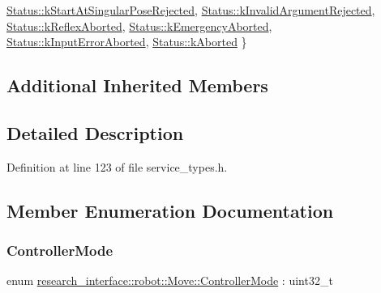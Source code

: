 \begin{DoxyCompactItemize}
\newline
\hyperlink{structresearch__interface_1_1robot_1_1Move_a74e15d249324a1b2d28f0a7cf50dc794ab6f94a8373495e5b2c77367f22b7f560}{Status\+::k\+Start\+At\+Singular\+Pose\+Rejected}, 
\hyperlink{structresearch__interface_1_1robot_1_1Move_a74e15d249324a1b2d28f0a7cf50dc794a9328e3d4adcd129e286cd0e65a9d4a1c}{Status\+::k\+Invalid\+Argument\+Rejected}, 
\hyperlink{structresearch__interface_1_1robot_1_1Move_a74e15d249324a1b2d28f0a7cf50dc794aedb741f9f460686f7d799eb503d047f1}{Status\+::k\+Reflex\+Aborted}, 
\hyperlink{structresearch__interface_1_1robot_1_1Move_a74e15d249324a1b2d28f0a7cf50dc794a452811dc518f62ba40861befb68a20cf}{Status\+::k\+Emergency\+Aborted}, 
\newline
\hyperlink{structresearch__interface_1_1robot_1_1Move_a74e15d249324a1b2d28f0a7cf50dc794acfa49311eb3442e8f47f921b951ef1eb}{Status\+::k\+Input\+Error\+Aborted}, 
\hyperlink{structresearch__interface_1_1robot_1_1Move_a74e15d249324a1b2d28f0a7cf50dc794ac20d0424ae4484fda4424713f021d736}{Status\+::k\+Aborted}
 \}
\end{DoxyCompactItemize}
\subsection*{Additional Inherited Members}


\subsection{Detailed Description}


Definition at line 123 of file service\+\_\+types.\+h.



\subsection{Member Enumeration Documentation}
\mbox{\label{structresearch__interface_1_1robot_1_1Move_a3e7b80b30bbf01dc902c84402502ebbc}} 
\subsubsection{\texorpdfstring{Controller\+Mode}{ControllerMode}}
{\footnotesize\ttfamily enum \hyperlink{structresearch__interface_1_1robot_1_1Move_a3e7b80b30bbf01dc902c84402502ebbc}{research\+\_\+interface\+::robot\+::\+Move\+::\+Controller\+Mode} \+: uint32\+\_\+t\hspace{0.3cm}{\ttfamily [strong]}}

